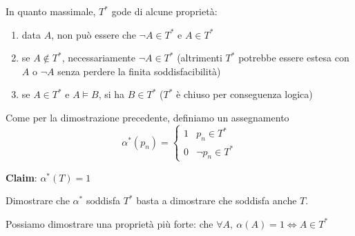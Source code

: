 \documentclass[a4paper,11pt]{report}
\begin{document}
In quanto massimale, \( T^* \) gode di alcune proprietà:
\begin{enumerate}
    \item data \( A \), non può essere che \( \neg A \in T^* \) e \( A \in T^* \)
    \item se \( A \not\in T^*\), necessariamente \( \neg A \in T^* \) {\color{gray}(altrimenti \( T^* \) potrebbe essere estesa con \( A \) o \( \neg A \) senza perdere la finita soddisfacibilità)}
    \item se \( A \in T^* \) e \( A \vDash B \), si ha \( B \in T^* \) (\( T^* \) è chiuso per conseguenza logica)
\end{enumerate}

Come per la dimostrazione precedente, definiamo un assegnamento
\[ \alpha^*(p_n) = \begin{cases}
    1 & p_n \in T^* \\
    0 & \neg p_n \in T^*
\end{cases}  \]

\textbf{Claim}: \( \alpha^*(T)=1 \)

Dimostrare che \( \alpha^* \) soddisfa \( T^* \) basta a dimostrare che soddisfa anche \( T \). 

Possiamo dimostrare una proprietà più forte: che \( \forall A, \ \alpha(A)=1 \iff A \in T^* \)
\end{document}
